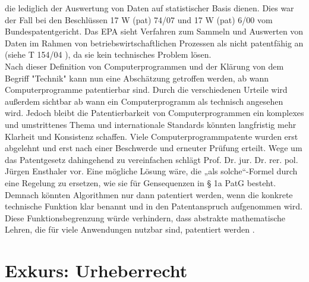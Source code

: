 die lediglich der Auswertung von Daten auf statistischer Basis dienen.
Dies war der Fall bei den Beschlüssen 17 W (pat) 74/07\cite{BPatG10012012}
und 17 W (pat) 6/00 \cite{BPatG01032001} vom Bundespatentgericht.
Das EPA sieht Verfahren zum Sammeln und Auswerten von Daten 
im Rahmen von betriebswirtschaftlichen Prozessen als nicht patentfähig an 
(siehe T 154/04 \cite{EuropaischesPatentamt152006}),
da sie kein technisches Problem lösen.
\\
Nach dieser Definition von Computerprogrammen und der Klärung von dem Begriff
"Technik" kann nun eine Abschätzung getroffen werden, 
ab wann Computerprogramme patentierbar sind. 
Durch die verschiedenen Urteile wird außerdem sichtbar 
ab wann ein Computerprogramm als technisch angesehen wird.
Jedoch bleibt die Patentierbarkeit von Computerprogrammen 
ein komplexes und umstrittenes Thema 
und internationale Standards könnten 
langfristig mehr Klarheit und Konsistenz schaffen.
Viele Computerprogrammpatente wurden erst abgelehnt und erst nach 
einer Beschwerde und erneuter Prüfung erteilt.
Wege um das Patentgesetz dahingehend zu vereinfachen schlägt 
Prof. Dr. jur. Dr. rer. pol. Jürgen Ensthaler vor. 
Eine mögliche Lösung wäre, die „als solche“-Formel durch eine Regelung zu ersetzen, 
wie sie für Gensequenzen in § 1a PatG besteht. 
Demnach könnten Algorithmen nur dann patentiert werden, 
wenn die konkrete technische Funktion klar benannt 
und in den Patentanspruch aufgenommen wird. 
Diese Funktionsbegrenzung würde verhindern, 
dass abstrakte mathematische Lehren, 
die für viele Anwendungen nutzbar sind, patentiert werden 
\cite{ensthalerEnsthalerBegrenzungPatentierung2013}. 
\section{Exkurs: Urheberrecht\label{sec:urh}}






